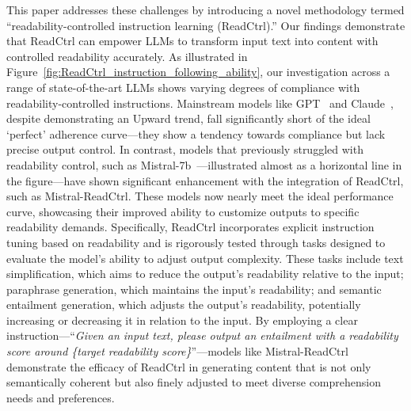 \documentclass[11pt]{article}
\begin{document}
This paper addresses these challenges by introducing a novel methodology termed ``readability-controlled instruction learning (ReadCtrl).''
Our findings demonstrate that ReadCtrl can empower LLMs to transform input text into content with controlled readability accurately. 
As illustrated in Figure~\ref{fig:ReadCtrl_instruction_following_ability}, our investigation across a range of state-of-the-art LLMs shows varying degrees of compliance with readability-controlled instructions. 
Mainstream models like GPT~\cite{achiam2023gpt} and Claude~\cite{TheC3}, despite demonstrating an Upward trend, fall significantly short of the ideal `perfect' adherence curve—they show a tendency towards compliance but lack precise output control.
In contrast, models that previously struggled with readability control, such as Mistral-7b~\cite{jiang2023mistral}—illustrated almost as a horizontal line in the figure—have shown significant enhancement with the integration of ReadCtrl, such as Mistral-ReadCtrl. 
These models now nearly meet the ideal performance curve, showcasing their improved ability to customize outputs to specific readability demands.
Specifically, ReadCtrl incorporates explicit instruction tuning based on readability and is rigorously tested through tasks designed to evaluate the model’s ability to adjust output complexity. 
These tasks include text simplification, which aims to reduce the output's readability relative to the input; paraphrase generation, which maintains the input's readability; and semantic entailment generation, which adjusts the output’s readability, potentially increasing or decreasing it in relation to the input. 
By employing a clear instruction—``\emph{Given an input text, please output an entailment with a readability score around \{target readability score\}}''—models like Mistral-ReadCtrl demonstrate the efficacy of ReadCtrl in generating content that is not only semantically coherent but also finely adjusted to meet diverse comprehension needs and preferences. 
\end{document}
